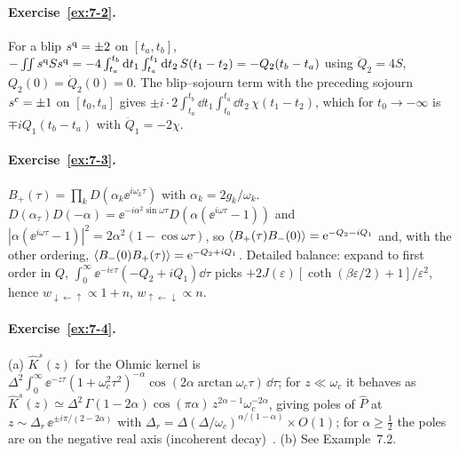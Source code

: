 \paragraph{Exercise~\ref{ex:7-2}.}
For a blip $s^{\mathrm{q}}=\pm2$ on $[t_a,t_b]$, $-\int\!\!\int s^{\mathrm{q}} Ss^{\mathrm{q}}=-4\int_{t_a}^{t_b}\mathrm{d} t_1\int_{t_a}^{t_1}\mathrm{d} t_2\,S(t_1-t_2)=-Q_2(t_b-t_a)$ using $\ddot Q_2=4S$, $Q_2(0)=\dot Q_2(0)=0$.
The blip--sojourn term with the preceding sojourn $s^{\mathrm{c}}=\pm1$ on $[t_0,t_a]$ gives $\pm i\cdot2\int_{t_a}^{t_b}\dd t_1\int_{t_0}^{t_a}\dd t_2\,\chi(t_1-t_2)$, which for $t_0\to-\infty$ is $\mp iQ_1(t_b-t_a)$ with $\ddot Q_1=-2\chi$.

\paragraph{Exercise~\ref{ex:7-3}.}
$B_+(\tau)=\prod_kD(\alpha_k\ee^{i\omega_k\tau})$ with $\alpha_k=2g_k/\omega_k$.
$D(\alpha_\tau)D(-\alpha)=\ee^{-i\alpha^2\sin\omega\tau}D(\alpha(\ee^{i\omega\tau}-1))$ and $|\alpha(\ee^{i\omega\tau}-1)|^2=2\alpha^2(1-\cos\omega\tau)$, so $\langle B_+(\tau)B_-(0)\rangle=\mathrm{e}^{-Q_2-iQ_1}$ and, with the other ordering, $\langle B_-(0)B_+(\tau)\rangle=\mathrm{e}^{-Q_2+iQ_1}$.
Detailed balance: expand to first order in $Q$, $\int_0^\infty\ee^{-i\varepsilon\tau}(-Q_2+iQ_1)\dd\tau$ picks $+2J(\varepsilon)[\coth(\beta\varepsilon/2)+1]/\varepsilon^2$, hence $w_{\downarrow\leftarrow\uparrow}\propto1+n$, $w_{\uparrow\leftarrow\downarrow}\propto n$.

\paragraph{Exercise~\ref{ex:7-4}.}
(a) $\hat K^s(z)$ for the Ohmic kernel is $\Delta^2\int_0^\infty\ee^{-z\tau}(1+\omega_c^2\tau^2)^{-\alpha}\cos(2\alpha\arctan\omega_c\tau)\,\dd\tau$; for $z\ll\omega_c$ it behaves as $\hat K^s(z)\simeq\Delta^2\,\Gamma(1-2\alpha)\cos(\pi\alpha)\,z^{2\alpha-1}\omega_c^{-2\alpha}$, giving poles of $\hat P$ at $z\sim\Delta_r\,\ee^{\pm i\pi/(2-2\alpha)}$ with $\Delta_r=\Delta(\Delta/\omega_c)^{\alpha/(1-\alpha)}\times O(1)$; for $\alpha\ge\tfrac12$ the poles are on the negative real axis (incoherent decay)~\cite[Sec.~V]{Leggett1987}.
(b) See Example~7.2.

